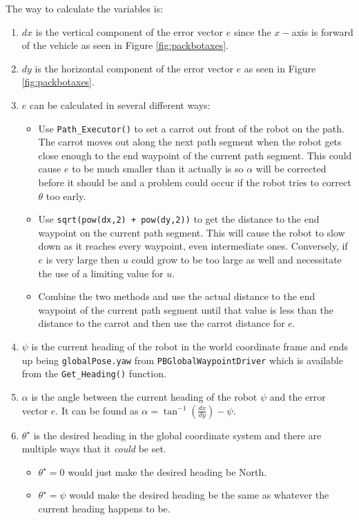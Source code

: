 \documentclass[12pt]{article}
\begin{document}
The way to calculate the variables is:
\begin{enumerate}
\item $dx$ is the vertical component of the error vector $e$ since the $x-$axis is forward of the vehicle as seen in Figure \ref{fig:packbotaxes}.
\item $dy$ is the horizontal component of the error vector $e$ as seen in Figure \ref{fig:packbotaxes}.
\item $e$ can be calculated in several different ways:
\begin{itemize}
\item Use \texttt{Path\_Executor()} to set a carrot out front of the robot on the path. The carrot moves out along the next path segment when the robot gets close enough to the end waypoint of the current path segment. This could cause $e$ to be much smaller than it actually is so $\alpha$ will be corrected before it should be and a problem could occur if the robot tries to correct $\theta$ too early.
\item Use \texttt{sqrt(pow(dx,2) + pow(dy,2))} to get the distance to the end waypoint on the current path segment. This will cause the robot to slow down as it reaches every waypoint, even intermediate ones. Conversely, if $e$ is very large then $u$ could grow to be too large as well and necessitate the use of a limiting value for $u$.
\item Combine the two methods and use the actual distance to the end waypoint of the current path segment until that value is less than the distance to the carrot and then use the carrot distance for $e$.
\end{itemize}
\item $\psi$ is the current heading of the robot in the world coordinate frame and ends up being \texttt{globalPose.yaw} from \texttt{PBGlobalWaypointDriver} which is available from the \texttt{Get\_Heading()} function.
\item $\alpha$ is the angle between the current heading of the robot $\psi$ and the error vector $e$. It can be found as $\alpha = \tan^{-1}\left(\frac{dx}{dy}\right) - \psi$.
\item $\theta^\star$ is the desired heading in the global coordinate system and there are multiple ways that it \textit{could} be set.
\begin{itemize}
\item $\theta^\star=0$ would just make the desired heading be North.
\item $\theta^\star=\psi$ would make the desired heading be the same as whatever the current heading happens to be.

\end{itemize}
\end{enumerate}
\end{document}
